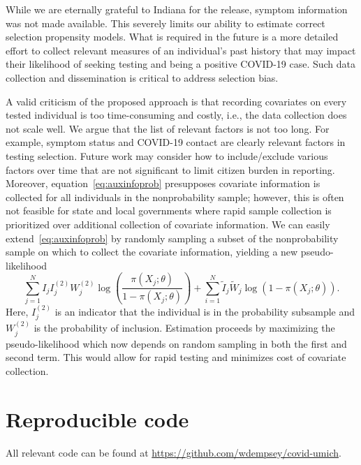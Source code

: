 \documentclass[11pt]{amsart}
\numberwithin{equation}{section}
\theoremstyle{plain}
\begin{document}
While we are eternally grateful to Indiana for the release, symptom information was not made available.  This severely limits our ability to estimate correct selection propensity models.  What is required in the future is a more detailed effort to collect relevant measures of an individual's past history that may impact their likelihood of seeking testing and being a positive COVID-19 case.  Such data collection and dissemination is critical to address selection bias.

A valid criticism of the proposed approach is that recording covariates on every tested individual is too time-consuming and costly, i.e., the data collection does not scale well.  We argue that the list of relevant factors is not too long.  For example, symptom status and COVID-19 contact are clearly relevant factors in testing selection.  Future work may consider how to include/exclude various factors over time that are not significant to limit citizen burden in reporting.  Moreover, equation~\eqref{eq:auxinfoprob} presupposes covariate information is collected for all individuals in the nonprobability sample; however, this is often not feasible for state and local governments where rapid sample collection is prioritized over additional collection of covariate information.  We can easily extend~\eqref{eq:auxinfoprob} by randomly sampling a subset of the nonprobability sample on which to collect the covariate information, yielding a new pseudo-likelihood
\begin{equation*}
\sum_{j=1}^N I_j I_j^{(2)} W_j^{(2)} \log \left( \frac{\pi (X_j; \theta)}{1-\pi(X_j; \theta)} \right)  + \sum_{i=1}^N \tilde I_j \tilde W_j \log ( 1 - \pi (X_j; \theta)).
\end{equation*}
Here, $I_j^{(2)}$ is an indicator that the individual is in the probability subsample and $W_j^{(2)}$ is the probability of inclusion.  Estimation proceeds by maximizing the pseudo-likelihood which now depends on random sampling in both the first and second term.  This would allow for rapid testing and minimizes cost of covariate collection.




\newpage
\appendix

\section{Reproducible code}

All relevant code can be found at \url{https://github.com/wdempsey/covid-umich}.
\end{document}
